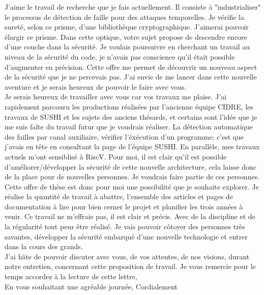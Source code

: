 \begin{large}
\begin{justify}
J'aime le travail de recherche que je fais actuellement. Il consiste à "industrialiser" le processus de détection de faille pour des attaques temporelles.
Je vérifie la sureté, selon ce prisme, d'une bibliothèque cryptographique. J'aimerai pouvoir élargir ce prisme. Dans cette optique, votre sujet propose de 
descendre encore d'une couche dans la sécurité. Je voulais poursuivre en cherchant un travail au niveau de la sécurité du code, je n'avais pas conscience
qu'il était possible d'augmenter en précision. Cette offre me permet de découvrir un nouveau aspect de la sécurité que je ne percevais pas. J'ai envie
de me lancer dans cette nouvelle aventure et je serais heureux de pouvoir le faire avec vous.\\

Je serais heureux de travailler avec vous car vos travaux me plaise. J'ai rapidement parcouru les productions réalisées par l'ancienne équipe CIDRE, les travaux de SUSHI et les sujets des
anciens thésards, et certains sont l'idée que je me suis faîte du travail futur que je voudrais réaliser. La détection automatique des failles par canal auxiliaire,
vérifier l'éxécution d'un programme; c'est que j'avais en tête en consultant la page de l'équipe SUSHI. En parallèle, mes travaux actuels m'ont sensiblisé à RiscV. Pour moi, il est clair
qu'il est possible d'améliorer/développer la sécurité de cette nouvelle architecture, cela laisse donc de la place pour de nouvelles personnes. Je voudrais faire partie de ces personnes.\\

\newpage
Cette offre de thèse est donc pour moi une possibilité que je souhaite explorer. Je réalise la quantité de travail à abattre, l'ensemble des articles et pages de documentation à lire
pour bien cerner le projet et planifier les trois années à venir. Ce travail ne m'effraie pas, il est clair et précis. Avec de la discipline et de la régularité tout peur être réalisé.
Je vais pouvoir côtoyer des personnes très savantes, développer la sécurité embarqué d'une nouvelle technologie et entrer dans la cours des grands.\\

J'ai hâte de pouvoir discuter avec vous, de vos attentes, de nos visions, durant notre entretien, concernant cette proposition de travail.
Je vous remercie pour le temps accordez à la lecture de cette lettre,\\

En vous souhaitant une agréable journée,\medbreak
Cordialement\\





\end{justify}
\end{large}
